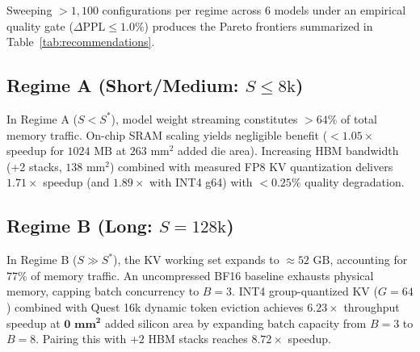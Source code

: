 \documentclass[conference,onecolumn]{IEEEtran}
\begin{document}
\begin{table}[t]
\caption{Recommended Memory-Hierarchy Configurations Across Context Regimes (Calibrated H100 SXM, LLaMA-3.1-8B).}
\label{tab:recommendations}
\centering
{}
\end{table}

Sweeping $>1,100$ configurations per regime across 6 models under an empirical quality gate ($\Delta\text{PPL} \le 1.0\%$) produces the Pareto frontiers summarized in Table~\ref{tab:recommendations}.

\subsection{Regime A (Short/Medium: $S \le 8\text{k}$)}
In Regime A ($S < S^*$), model weight streaming constitutes $>64\%$ of total memory traffic. On-chip SRAM scaling yields negligible benefit ($<1.05\times$ speedup for $1024\text{ MB}$ at $263\text{ mm}^2$ added die area). Increasing HBM bandwidth (+2 stacks, $138\text{ mm}^2$) combined with measured FP8 KV quantization delivers $1.71\times$ speedup (and $1.89\times$ with INT4 g64) with $<0.25\%$ quality degradation.

\subsection{Regime B (Long: $S = 128\text{k}$)}
In Regime B ($S \gg S^*$), the KV working set expands to $\approx 52\text{ GB}$, accounting for $77\%$ of memory traffic. An uncompressed BF16 baseline exhausts physical memory, capping batch concurrency to $B=3$. INT4 group-quantized KV ($G=64$) combined with Quest 16k dynamic token eviction achieves $\mathbf{6.23\times}$ throughput speedup at $\mathbf{0\text{ mm}^2}$ added silicon area by expanding batch capacity from $B=3$ to $B=8$. Pairing this with $+2$ HBM stacks reaches $\mathbf{8.72\times}$ speedup.
\end{document}
